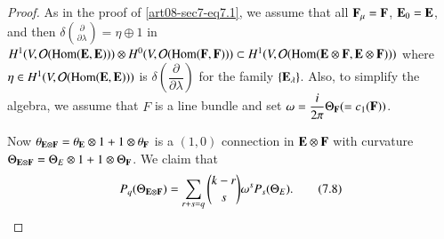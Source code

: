 \begin{proof}
As in the proof of \eqref{art08-sec7-eq7.1}, we assume that all $\mathbf{F}_{\mu}=\mathbf{F}$, $\mathbf{E}_{0}=\mathbf{E}$, and then $\delta\binom{\partial}{\partial \lambda}=\eta\oplus 1$ in $H^{1}(V,\mathcal{O}(\operatorname{\mathrm{Hom}}(\mathbf{E},\mathbf{E})))\otimes H^{0}(V,\mathcal{O}(\operatorname{\mathrm{Hom}}(\mathbf{F},\mathbf{F})))\subset H^{1}(V,\mathcal{O}(\operatorname{\mathrm{Hom}}(\mathbf{E}\otimes \mathbf{F},\mathbf{E}\otimes\mathbf{F})))$ where $\eta\in H^{1}(V,\mathcal{O}(\operatorname{\mathrm{Hom}}(\mathbf{E},\mathbf{E})))$ is $\delta\left(\dfrac{\partial}{\partial \lambda}\right)$ for the family $\{\mathbf{E}_{\lambda}\}$. Also, to simplify the algebra, we assume that $F$ is a line bundle and set $\omega=\dfrac{i}{2\pi}\Theta_{\mathbf{F}}(=c_{1}(\mathbf{F}))$.

Now $\theta_{\mathbf{E}\otimes \mathbf{F}}=\theta_{\mathbf{E}}\otimes 1+1\otimes \theta_{\mathbf{F}}$ is a $(1,0)$ connection in $\mathbf{E}\otimes \mathbf{F}$ with curvature $\Theta_{\mathbf{E}\otimes \mathbf{F}}=\Theta_{E}\otimes 1+1\otimes \Theta_{\mathbf{F}}$. We claim that
\begin{equation*}
P_{q}(\Theta_{\mathbf{E}\otimes\mathbf{F}})=\sum\limits_{r+s=q}\binom{k-r}{s}\omega^{s}P_{s}(\Theta_{E}).\tag{7.8}\label{art08-sec7-eq7.8}
\end{equation*}
\end{proof}

